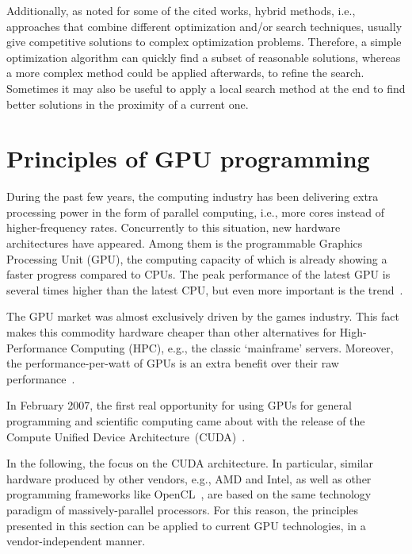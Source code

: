 Additionally, as noted for some of the cited works, hybrid methods,
i.e., approaches that combine different optimization and/or search
techniques, usually give competitive solutions to complex optimization
problems. Therefore, a simple optimization algorithm can quickly find
a subset of reasonable solutions, whereas a more complex method could
be applied afterwards, to refine the search. Sometimes it may also
be useful to apply a local search method at the end to find better
solutions in the proximity of a current one.


\chapter{Principles of GPU programming \label{chap:02-Principles_of_GPU_programming}}

During the past few years, the computing industry has been delivering
extra processing power in the form of parallel computing, i.e., more
cores instead of higher-frequency rates. Concurrently to this situation,
new hardware architectures have appeared. Among them is the programmable
Graphics Processing Unit (GPU),
the computing capacity of which is already showing a faster progress
compared to CPUs. The peak performance of the latest GPU is several
times higher than the latest CPU, but even more important is the trend~\cite{Cruz-How_to_obtain_efficient_GPU_kernels:2011}.

The GPU market was almost exclusively driven by the games industry.
This fact makes this commodity hardware cheaper than other alternatives
for High-Performance Computing (HPC),
e.g., the classic \textquoteleft{}mainframe\textquoteright{} servers.
Moreover, the performance-per-watt of GPUs is an extra benefit over
their raw performance~\cite{Cruz-How_to_obtain_efficient_GPU_kernels:2011}.

In February 2007, the first real opportunity for using GPUs for general
programming and scientific computing came about with the release of
the Compute Unified Device Architecture~(CUDA)~\cite{CUDA}.

In the following, the focus on the CUDA architecture. In particular,
similar hardware produced by other vendors, e.g., AMD and Intel, as
well as other programming frameworks like OpenCL~\cite{Stone_OpenCL.A.parallel.programming.standard:2010},
are based on the same technology paradigm of massively-parallel processors.
For this reason, the principles presented in this section can be applied
to current GPU technologies, in a vendor-independent manner.


